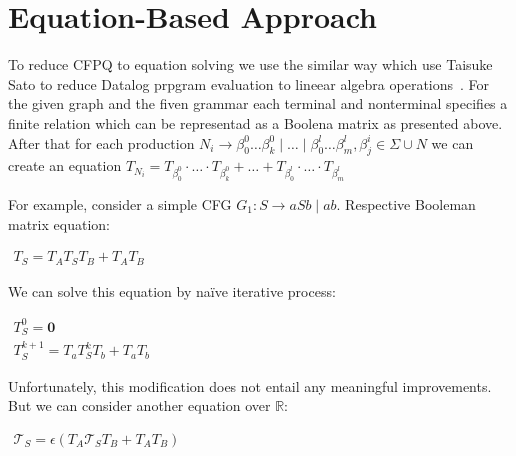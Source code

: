 \documentclass[sigconf]{acmart}
\begin{document}
\section{Equation-Based Approach}


To reduce CFPQ to equation solving we use the similar way which use Taisuke Sato to reduce Datalog prpgram evaluation to lineear algebra operations~\cite{sato2017linear}.
For the given graph and the fiven grammar each terminal and nonterminal specifies a finite relation which can be representad as a Boolena matrix as presented above.
After that for each production $N_i \to \beta^0_0 \dots \beta^0_k \mid \ldots \mid \beta^l_0 \dots \beta^l_m, \beta^i_j \in \Sigma \cup N$ we can create an equation $T_{N_i} = T_{\beta^0_0}\cdot \ldots \cdot T_{\beta^0_k} + \ldots + T_{\beta^l_0}\cdot \ldots \cdot T_{\beta^l_m} $

For example, consider a simple CFG $G_1 : S \rightarrow aSb \mid ab$. 
Respective Booleman matrix equation:



\begin{center}
\(
\left. 
\begin{array}{l}
T_S = T_AT_ST_B + T_AT_B
\end{array} 
\right.
\)
\end{center}

We can solve this equation by na\"ive iterative process:
\begin{center}
\(
\left. 
\begin{array}{l}
T_S^0 = \mathbf{0} \\
T_S^{k+1} = T_a T_S^k T_b + T_a T_b
\end{array} 
\right.
\)
\end{center}

Unfortunately, this modification does not entail any meaningful improvements. 
But we can consider another equation over $\mathbb{R}$:

\begin{center}
\(
\left. 
\begin{array}{l}
\mathcal{T}_S = \epsilon(T_A \mathcal{T}_S T_B + T_A T_B)
\end{array}
\right.
\)
\end{center}
\end{document}
